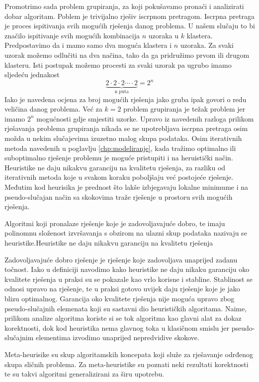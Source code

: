 \documentclass[a4paper,twoside,12pt]{memoir} %
\begin{document}
Promotrimo sada problem grupiranja, za koji pokušavamo pronaći i analizirati dobar algoritam. Poblem je trivijalno rješiv iscrpnom pretragom. Iscrpna pretraga je proces ispitivanja svih mogućih rješenja danog problema. U našem slučaju to bi značilo ispitivanje svih mogućih kombinacija $n$ uzoraka u $k$ klastera. Predpostavimo da i mamo samo dva moguća klastera i $n$ uzoraka. Za svaki uzorak možemo odlučiti na dva načina, tako da ga pridružimo prvom ili drugom klasteru. Isti postupak možemo procesti za svaki uzorak pa ugrubo imamo sljedeću jednakost
\[
	\underbrace{2\cdot 2\cdot 2\cdots \cdot2}_\text{n puta} = 2^n
\]
Iako je navedena ocjena za broj mogućih rješenja jako gruba ipak govori o redu veličina danog problema. Već za $k=2$ problem grupiranja je težak problem jer imamo $2^n$ mogućnosti gdje smjestiti uzorke. Upravo iz navedenih razloga prilikom rješavanja problema grupiranja nikada se ne upotrebljava iscrpna pretraga osim možda u nekim slučajevima izuzetno malog skupa podataka. Osim iterativnih metoda navedenih u poglavlju \ref{chp:modeliranje}, kada tražimo optimalno ili suboptimalno rješenje problemu je moguće pristupiti i na heruistički način. Heuristike ne daju nikakvu garanciju na kvalitetu rješenja, za razliku od iterativnih metoda koje u svakom koraku poboljšaju već postojeće rješenje. Međutim kod heurisika je prednost što lakše izbjegavaju lokalne minimume i na pseudo-slučajan način sa skokovima traže rješenje u prostoru svih mogućih rješenja.
\begin{defn}
Algoritmi koji pronalaze rješenje koje je zadovoljavajuće dobro, te imaju polinomnu složenost izvršavanja s obzirom na ulazni skup podataka nazivaju se heuristike.Heuristike ne daju nikakvu garanciju na kvalitetu rješenja
\end{defn}
Zadovoljavajuće dobro rješenje je rješenje koje zadovoljava unaprijed zadanu točnost. Iako u definiciji navodimo kako heuristike ne daju nikaku garanciju oko kvalitete rješenja u praksi su se pokazale kao vrlo korisne i stabline. Stablinost se odnosi upravo na rješenje, te u praksi gotovo uvijek daju rješenje koje je jako blizu optimalnog. Garancija oko kvalitete rješenja nije moguća upravo zbog pseudo-slučajnih elemenata koji su sastavni dio heurističkih algoritama. Naime, prilikom analize algoritma koriste si se tok algoritma kao glavni alat za dokaz korektnosti, dok kod heuristika nema glavnog toka u klasičnom smislu jer pseudo-slučajnim elementima izvodimo unaprijed nepredvidive skokove.
\begin{defn}
Meta-heurisike su skup algoritamskih koncepata koji služe za rješavanje odrđenog skupa sličnih problema. Za meta-heuristike su poznati neki rezultati korektnosti te su takvi algoritmi generalizirani za širu upotrebu.
\end{defn}
\end{document}
